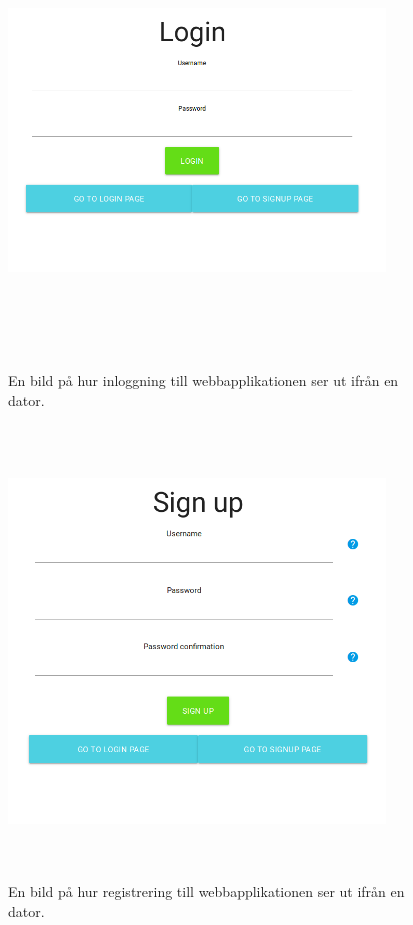 \documentclass[swedish, a4paper,12pt]{article}
\begin{document}
\begin{figure}[H]
  \centering
  \includegraphics[width=10cm, height=12cm]{media/comp_log_in.png}
  \caption{En bild på hur inloggning till webbapplikationen ser ut ifrån en dator.}
  \label{fig:comp_log_in}
\end{figure}

\begin{figure}[H]
  \centering
  \includegraphics[width=10cm, height=12cm]{media/comp_sign_in.png}
  \caption{En bild på hur registrering till webbapplikationen ser ut ifrån en dator.}
  \label{fig:comp_sign_in.png}
\end{figure}
\end{document}
